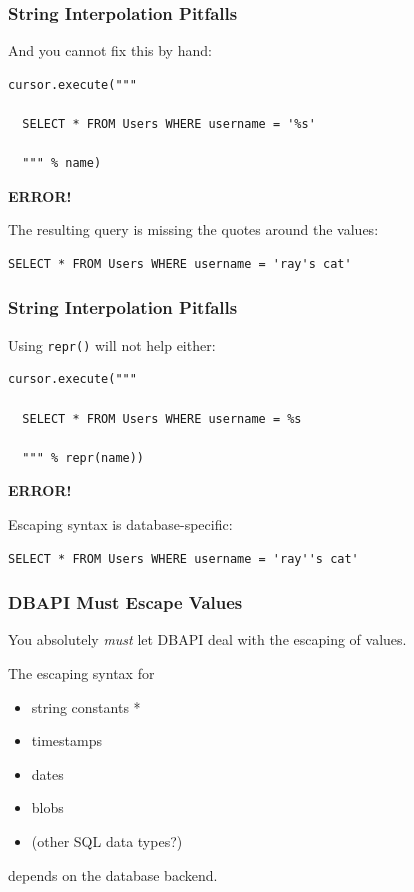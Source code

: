 \documentclass{beamer}
\newcommand{\bigerror}{\begin{center}{\textbf{ERROR!}}\end{center}}
\begin{document}
\begin{frame}[fragile]
  \frametitle{String Interpolation Pitfalls}

And you cannot fix this by hand:
\begin{verbatim}
cursor.execute("""

  SELECT * FROM Users WHERE username = '%s'

  """ % name)
\end{verbatim}

\bigerror

The resulting query is missing the quotes around the values:
\begin{verbatim}
SELECT * FROM Users WHERE username = 'ray's cat'
\end{verbatim}

\end{frame}


\begin{frame}[fragile]
  \frametitle{String Interpolation Pitfalls}

Using \texttt{repr()} will not help either:
\begin{verbatim}
cursor.execute("""

  SELECT * FROM Users WHERE username = %s

  """ % repr(name))
\end{verbatim}

\bigerror

Escaping syntax is database-specific:
\begin{verbatim}
SELECT * FROM Users WHERE username = 'ray''s cat'
\end{verbatim}

\end{frame}


\begin{frame}[fragile]
  \frametitle{DBAPI Must Escape Values}

  You absolutely \emph{must} let DBAPI deal with the escaping of
  values.

\vfill

  The escaping syntax for
  \begin{itemize}
  \item string constants *
  \item timestamps
  \item dates
  \item blobs
  \item (other SQL data types?)
  \end{itemize}
  depends on the database backend.

\end{frame}
\end{document}
